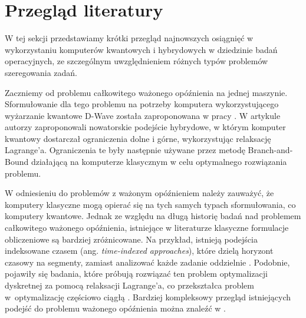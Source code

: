 
\section{Przegląd literatury}

W tej sekcji przedstawiamy krótki przegląd najnowszych osiągnięć w wykorzystaniu komputerów kwantowych i hybrydowych w dziedzinie badań operacyjnych, ze szczególnym uwzględnieniem różnych typów problemów szeregowania zadań.

Zaczniemy od problemu całkowitego ważonego opóźnienia na jednej maszynie. Sformułowanie dla tego problemu na potrzeby komputera wykorzystującego wyżarzanie kwantowe D-Wave została zaproponowana w pracy \cite{10.1007/978-3-031-08760-8_15}. W artykule \cite{10703120} autorzy zaproponowali nowatorskie podejście hybrydowe, w którym komputer kwantowy dostarczał ograniczenia dolne i górne, wykorzystując relaksację Lagrange’a. Ograniczenia te były następnie używane przez metodę Branch-and-Bound działającą na komputerze klasycznym w celu optymalnego rozwiązania problemu.

W odniesieniu do problemów z ważonym opóźnieniem należy zauważyć, że komputery klasyczne mogą opierać się na tych samych typach sformułowania, co komputery kwantowe. Jednak ze względu na długą historię badań nad problemem całkowitego ważonego opóźnienia, istniejące w literaturze klasyczne formulacje obliczeniowe są bardziej zróżnicowane. Na przykład, istnieją podejścia indeksowane czasem (ang. \textit{time-indexed approaches}), które dzielą horyzont czasowy na segmenty, zamiast analizować każde zadanie oddzielnie \cite{doi:10.1287/ijoc.1070.0225}. Podobnie, pojawiły się badania, które próbują rozwiązać ten problem optymalizacji dyskretnej za pomocą relaksacji Lagrange’a, co przekształca problem w~optymalizację częściowo ciągłą \cite{rudy2024new}. Bardziej kompleksowy przegląd istniejących podejść do problemu ważonego opóźnienia można znaleźć w \cite{ABDULRAZAQ1990235}.

